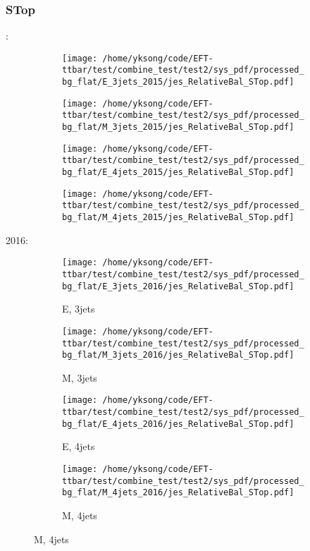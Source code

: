 \documentclass{beamer}
\begin{document}
\begin{frame}
\frametitle{STop}
\fontsize{5}{1}:
\begin{figure}
\centering
\begin{subfigure}[b]{0.24\textwidth}
\texttt{[image: /home/yksong/code/EFT-ttbar/test/combine\_test/test2/sys\_pdf/processed\_bg\_flat/E\_3jets\_2015/jes\_RelativeBal\_STop.pdf]}
\end{subfigure}
\begin{subfigure}[b]{0.24\textwidth}
\texttt{[image: /home/yksong/code/EFT-ttbar/test/combine\_test/test2/sys\_pdf/processed\_bg\_flat/M\_3jets\_2015/jes\_RelativeBal\_STop.pdf]}
\end{subfigure}
\begin{subfigure}[b]{0.24\textwidth}
\texttt{[image: /home/yksong/code/EFT-ttbar/test/combine\_test/test2/sys\_pdf/processed\_bg\_flat/E\_4jets\_2015/jes\_RelativeBal\_STop.pdf]}
\end{subfigure}
\begin{subfigure}[b]{0.24\textwidth}
\texttt{[image: /home/yksong/code/EFT-ttbar/test/combine\_test/test2/sys\_pdf/processed\_bg\_flat/M\_4jets\_2015/jes\_RelativeBal\_STop.pdf]}
\end{subfigure}
\end{figure}
2016:
\begin{figure}
\centering
\begin{subfigure}[b]{0.24\textwidth}
\texttt{[image: /home/yksong/code/EFT-ttbar/test/combine\_test/test2/sys\_pdf/processed\_bg\_flat/E\_3jets\_2016/jes\_RelativeBal\_STop.pdf]}
\captionsetup{font=tiny}
\caption{E, 3jets}
\end{subfigure}
\begin{subfigure}[b]{0.24\textwidth}
\texttt{[image: /home/yksong/code/EFT-ttbar/test/combine\_test/test2/sys\_pdf/processed\_bg\_flat/M\_3jets\_2016/jes\_RelativeBal\_STop.pdf]}
\captionsetup{font=tiny}
\caption{M, 3jets}
\end{subfigure}
\begin{subfigure}[b]{0.24\textwidth}
\texttt{[image: /home/yksong/code/EFT-ttbar/test/combine\_test/test2/sys\_pdf/processed\_bg\_flat/E\_4jets\_2016/jes\_RelativeBal\_STop.pdf]}
\captionsetup{font=tiny}
\caption{E, 4jets}
\end{subfigure}
\begin{subfigure}[b]{0.24\textwidth}
\texttt{[image: /home/yksong/code/EFT-ttbar/test/combine\_test/test2/sys\_pdf/processed\_bg\_flat/M\_4jets\_2016/jes\_RelativeBal\_STop.pdf]}
\captionsetup{font=tiny}
\caption{M, 4jets}
\end{subfigure}
\end{figure}
\end{frame}
\end{document}
